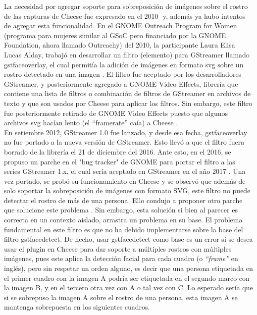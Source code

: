 \documentclass[a4paper,openright,12pt]{report}
\begin{document}
La necesidad por agregar soporte para sobreposición de imágenes sobre el rostro
de las capturas de Cheese fue expresado en el 2010 ⁠\cite{Bug6279256} y, además
ya hubo intentos de agregar esta funcionalidad. En el GNOME Outreach Program for
Women (programa para mujeres similar al GSoC pero financiado por la GNOME
Foundation, ahora llamado Outreachy) del 2010, la participante Laura Elisa Lucas
Alday, trabajó en desarrollar un filtro (elemento) para GStreamer llamado
gstfaceoverlay, el cual permitía la adición de imágenes en formato svg sobre un
rostro detectado en una imagen \cite{faceoverlay}\cite{gopw1}. El
filtro fue aceptado por los desarrolladores GStreamer, y posteriormente agregado
a GNOME Video Effects, librería que contiene una lista de filtros o combinación
de filtros de GStreamer en archivos de texto y que son usados por Cheese para
aplicar los filtros. Sin embargo, este filtro fue posteriormente retirado de
GNOME Video Effects puesto que algunos archivos svg hacían lento (el “framerate”
caía) a Cheese \cite{Bug6641489}.\\


En setiembre 2012, GStreamer 1.0 fue lanzado, y desde esa fecha, gstfaceoverlay
no fue portado a la nueva versión de GStreamer. Esto llevó a que el filtro fuera
borrado de la librería el 21 de diciembre del 2016. Ante esto, en el 2016, se
propuso un parche en el "bug tracker" de GNOME para portar el filtro a las
series GStreamer 1.x, el cual sería aceptado en GStreamer en el año 2017
\cite{Bug7640127}. Una vez portado, se probó su funcionamiento en Cheese
\cite{CFOCHfunnyStickersCheese} y se observó que además de solo soportar la
sobreposición de imágenes con formato SVG, este filtro no puede detectar el
rostro de más de una persona. Ello condujo a proponer otro parche que solucione
este problema \cite{Bug7691771}. Sin embargo, esta solución si bien al parecer
es correcta en un contexto aislado, arrastra un problema en su base. El problema
fundamental en este filtro es que no ha debido implementarse sobre la base del
filtro gstfacedetect. De hecho, usar gstfacedetect como base es un error si se
desea usar el plugin en Cheese para dar soporte a múltiples rostros con
múltiples imágenes, pues este aplica la detección facial para cada cuadro (o
\textit{“frame”} en inglés), pero sin respetar un orden alguno, es decir que una persona
etiquetada en el primer cuadro con la imagen A podría ser etiquetada en el
segundo marco con la imagen B, y en el tercero otra vez con A o tal vez con C.
Lo esperado sería que si se sobrepuso la imagen A sobre el rostro de una
persona, esta imagen A se mantenga sobrepuesta en los siguientes cuadros.\\
\end{document}
